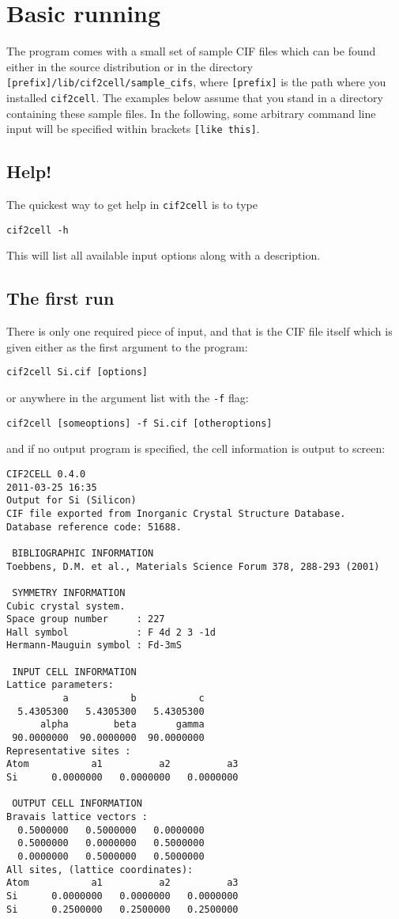 \documentclass[11pt]{article}
\newcommand{\ciftocell}{\texttt{cif2cell}}
\begin{document}
\section{Basic running}

The program comes with a small set of sample CIF files which can be found either in the source distribution or in the directory \texttt{[prefix]/lib/cif2cell/sample\_cifs}, where \texttt{[prefix]} is the path where you installed \ciftocell. The examples below assume that you stand in a directory containing these sample files. In the following, some arbitrary command line input will be specified within brackets \texttt{[like this]}.

\subsection{Help!}
The quickest way to get help in \ciftocell{} is to type
\begin{verbatim}
cif2cell -h
\end{verbatim}
This will list all available input options along with a description.

\subsection{The first run}
There is only one required piece of input, and that is the CIF file itself which is given either as the first argument to the program:
\begin{verbatim}
cif2cell Si.cif [options]
\end{verbatim}
or anywhere in the argument list with the \texttt{-f} flag:
\begin{verbatim}
cif2cell [someoptions] -f Si.cif [otheroptions]
\end{verbatim}
and if no output program is specified, the cell information is output to screen:

\newpage
\begin{verbatim}
CIF2CELL 0.4.0
2011-03-25 16:35
Output for Si (Silicon)
CIF file exported from Inorganic Crystal Structure Database.
Database reference code: 51688.

 BIBLIOGRAPHIC INFORMATION
Toebbens, D.M. et al., Materials Science Forum 378, 288-293 (2001) 

 SYMMETRY INFORMATION
Cubic crystal system.
Space group number     : 227
Hall symbol            : F 4d 2 3 -1d
Hermann-Mauguin symbol : Fd-3mS

 INPUT CELL INFORMATION
Lattice parameters:
          a           b           c 
  5.4305300   5.4305300   5.4305300 
      alpha        beta       gamma 
 90.0000000  90.0000000  90.0000000 
Representative sites :
Atom           a1          a2          a3 
Si      0.0000000   0.0000000   0.0000000

 OUTPUT CELL INFORMATION
Bravais lattice vectors :
  0.5000000   0.5000000   0.0000000 
  0.5000000   0.0000000   0.5000000 
  0.0000000   0.5000000   0.5000000 
All sites, (lattice coordinates):
Atom           a1          a2          a3 
Si      0.0000000   0.0000000   0.0000000
Si      0.2500000   0.2500000   0.2500000
\end{verbatim}
\end{document}
